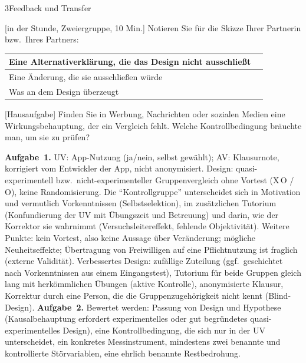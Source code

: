 \begin{uebungsblattb}{3}{Feedback und Transfer}

[in der Stunde, Zweiergruppe, 10 Min.]
Notieren Sie für die Skizze Ihrer Partnerin bzw.\ Ihres Partners:
\begin{center}
\renewcommand{\arraystretch}{2}
\begin{tabular}{|p{}|p{}|}
\hline
Eine Alternativerklärung, die das Design nicht ausschließt & \\ \hline
Eine Änderung, die sie ausschließen würde & \\ \hline
Was an dem Design überzeugt & \\ \hline
\end{tabular}
\end{center}

[Hausaufgabe]
Finden Sie in Werbung, Nachrichten oder sozialen Medien eine
Wirkungsbehauptung, der ein Vergleich fehlt. Welche Kontrollbedingung
bräuchte man, um sie zu prüfen?

\begin{lehrhinweis}[Erwartungshorizont]
\textbf{Aufgabe~1.} UV: App-Nutzung (ja/nein, selbst gewählt); AV:
Klausurnote, korrigiert vom Entwickler der App, nicht anonymisiert. Design:
quasi-experimentell bzw.\ nicht-experimenteller Gruppenvergleich ohne
Vortest (X\,O / \phantom{X\,}O), keine Randomisierung. Die
\enquote{Kontrollgruppe} unterscheidet sich in Motivation und vermutlich
Vorkenntnissen (Selbstselektion), im zusätzlichen Tutorium (Konfundierung
der UV mit Übungszeit und Betreuung) und darin, wie der Korrektor sie
wahrnimmt (Versuchsleitereffekt, fehlende Objektivität). Weitere Punkte:
kein Vortest, also keine Aussage über Veränderung; mögliche
Neuheitseffekte; Übertragung von Freiwilligen auf eine Pflichtnutzung ist
fraglich (externe Validität). Verbessertes Design: zufällige Zuteilung
(ggf.\ geschichtet nach Vorkenntnissen aus einem Eingangstest), Tutorium
für beide Gruppen gleich lang mit herkömmlichen Übungen (aktive
Kontrolle), anonymisierte Klausur, Korrektur durch eine Person, die die
Gruppenzugehörigkeit nicht kennt (Blind-Design).
\textbf{Aufgabe~2.} Bewertet werden: Passung von Design und Hypothese
(Kausalbehauptung erfordert experimentelles oder gut begründetes
quasi-experimentelles Design), eine Kontrollbedingung, die sich nur in der
UV unterscheidet, ein konkretes Messinstrument, mindestens zwei benannte
und kontrollierte Störvariablen, eine ehrlich benannte Restbedrohung.
\end{lehrhinweis}
\end{uebungsblattb}
